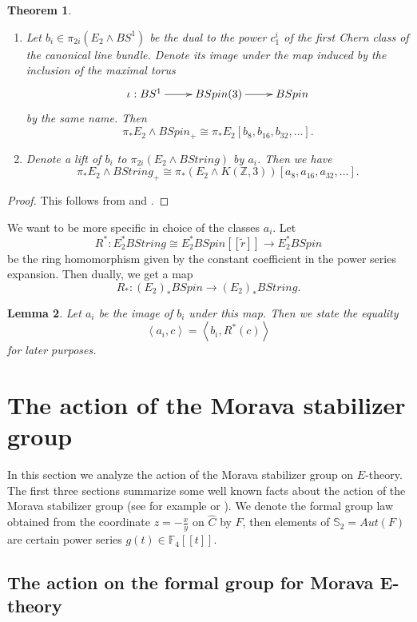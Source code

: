 \documentclass{amsart}
\renewcommand{\S}{{\mathbb S}}
\newcommand {\F}{{\mathbb F}}
\newcommand {\Z}{{\mathbb Z}}
\newcommand {\W}{{\mathbb W}}
\newcommand{\lra}{\longrightarrow}              %
\numberwithin{equation}{section}
\newtheorem{thm}{Theorem}[section]
\newtheorem{lemma}[thm]{Lemma}
\theoremstyle{definition}  %
\newtheorem{set theory}[thm]{Set Theoretic Prelude}
\begin{document}
\begin{thm}
\begin{enumerate}
\item
Let  $ b_i \in \pi_{2i}( E_2 \wedge BS^1)$ be the dual to the power ${c_1^i}$ of the first Chern class of the canonical line bundle. Denote its image  under the map induced by the inclusion of the maximal torus
$$\xymatrix{\iota: BS^1\ar[r]& BSpin(3)\ar[r]&BSpin}$$
by the same name. Then 
$$
\pi_*E_2\wedge BSpin_+ \cong \pi_*E_2 [b_{8}, b_{16},b_{32},\ldots].
$$
\item
Denote a lift of $b_i $ to $\pi_{2i} (E_2\wedge BString)$  by $a_i$. Then we have
$$ \pi_*E_2\wedge BString_+ \cong \pi_*(E_2\wedge K(\Z,3)) [a_{8}, a_{16},a_{32},\ldots].$$
\end{enumerate}
\end{thm}
\begin{proof}
This follows from \cite{MR1909866}\cite{MR2093483} and \cite{MR584466}.
\end{proof}
We want to be more specific in choice of the classes $a_i$. Let 
$$ R^*: E_2^*BString \cong E_2^*BSpin [\![ \tilde{r}]\! ] \lra E_2^*BSpin$$ be the ring homomorphism given by the constant coefficient in the power series expansion. Then dually, we get a map
$${R}_* : (E_2)_*BSpin  \lra (E_2)_*BString.$$

\begin{lemma}\label{small}
Let $a_i$ be the image of $b_i$ under this map. Then we state the equality
$$\left< a_i, c\right> = \left< b_i,  R^*(c)\right>$$
for later purposes.
\end{lemma}


\section{The action of the Morava stabilizer group}
In this section we analyze the action of the Morava stabilizer group on  $E$-theory. 
The first three sections summarize some well known facts about the action of the Morava stabilizer group (see for example \cite[Section 4]{MR3127044} or \cite[Section 6]{MR3581316}). We denote the formal group law obtained from the coordinate $z=-\frac{x}{y}$ on $\hat{C}$ by $F$, then elements of
$\S_2=Aut(F)$ are certain power series $g(t)\in\F_4[[t]]$. 



\subsection{The action on the formal group for Morava E-theory}
\end{document}
